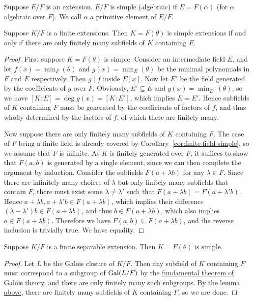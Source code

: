 \begin{definition}
    Suppose \(E/F\) is an extension.
    \(E/F\) is simple (algebraic)
    if \(E = F(\alpha)\) (for \(\alpha\) algebraic over \(F\)).
    We call \(\alpha\) a primitive element of \(E/F\).
\end{definition}
\begin{lemma}\label{lem:simple-finite-subfields}
    Suppose \(K/F\) is a finite extensions.
    Then \(K = F(\theta)\) is simple extensions
    if and only if there are only finitely many subfields of \(K\) containing \(F\).
\end{lemma}
\begin{proof}
    First suppose \(K = F(\theta)\) is simple.
    Consider an intermediate field \(E\),
    and let \(f(x) = \min_F(\theta)\) and \(g(x) = \min_E(\theta)\)
    be the minimal polynomials in \(F\) and \(E\) respectively.
    Then \(g \mid f\) inside \(E[x]\).
    Now let \(E'\) be the field generated by the coefficients of \(g\) over \(F\).
    Obviously, \(E' \subseteq E\) and \(g(x) = \min_{E'}(\theta)\),
    so we have \([K:E] = \deg g(x) = [K:E']\), which implies \(E = E'\).
    Hence subfields of \(K\) containing \(F\) must be generated by the coefficients of factors of \(f\),
    and thus wholly determined by the factors of \(f\), of which there are finitely many.

    Now suppose there are only finitely many subfields of \(K\) containing \(F\).
    The case of \(F\) being a finite field is already covered by Corollary~\ref{cor:finite-field-simple},
    so we assume that \(F\) is infinite.
    As \(K\) is finitely generated over \(F\),
    it suffices to show that \(F(a,b)\) is generated by a single element,
    since we can then complete the argument by induction.
    Consider the subfields \(F(a + \lambda b)\) for any \(\lambda \in F\).
    Since there are infinitely many choices of \(\lambda\) but only finitely many subfields that contain \(F\),
    there must exist some \(\lambda \neq \lambda'\) such that \(F(a + \lambda b) = F(a + \lambda' b)\).
    Hence \(a + \lambda b, a + \lambda' b \in F(a + \lambda b)\),
    which implies their difference \((\lambda-\lambda')b \in F(a + \lambda b)\),
    and thus \(b \in F(a + \lambda b)\), which also implies \(a \in F(a + \lambda b)\).
    Therefore we have \(F(a,b) \subseteq F(a + \lambda b)\),
    and the reverse inclusion is trivially true.
    We have equality.
\end{proof}
\begin{theorem}\label{thm:primitive-element-2}
    Suppose \(K/F\) is a finite separable extension.
    Then \(K = F(\theta)\) is simple.
\end{theorem}
\begin{proof}
    Let \(L\) be the Galois closure of \(K/F\).
    Then any subfield of \(K\) containing \(F\) must correspond to a subgroup of \(\operatorname{Gal}(L/F)\)
    by the \hyperref[thm:ftgt]{fundamental theorem of Galois theory},
    and there are only finitely many such subgroups.
    By the \hyperref[lem:simple-finite-subfields]{lemma above},
    there are finitely many subfields of \(K\) containing \(F\),
    so we are done.
\end{proof}


